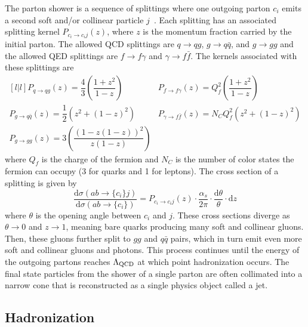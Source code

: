 The parton shower is a sequence of splittings where one outgoing parton $c_i$ emits a second soft and/or collinear particle $j$~\cite{Sjostrand2015}.
Each splitting has an associated splitting kernel $P_{c_i \rightarrow c_i j}(z)$, where $z$ is the momentum fraction carried by the initial parton.
The allowed QCD splittings are $q\rightarrow qg$, $g\rightarrow q \bar q$, and $g\rightarrow gg$ and the allowed QED splittings are $f\rightarrow f\gamma$ and $\gamma \rightarrow f \bar f$.
The kernels associated with these splittings are
\begin{equation}
  \begin{matrix}[l | l]
    P_{q\rightarrow qg}(z) = \dfrac{4}{3} \left( \dfrac{1+z^2}{1-z} \right)
    & P_{f \rightarrow f \gamma}(z) = Q_f^2 \left( \dfrac{1+z^2}{1-z} \right)
    \\ P_{g\rightarrow q \bar q}(z) = \dfrac{1}{2} \left( z^2 + (1-z)^2\right)
    & P_{\gamma \rightarrow f \bar f}(z) = N_C Q_f^2 \left( z^2 + (1-z)^2 \right) 
    \\ P_{g\rightarrow gg}(z) = 3 \left( \dfrac{(1-z(1-z))^2}{z(1-z)} \right)  & 
  \end{matrix}
\end{equation}
where $Q_f$ is the charge of the fermion and $N_C$ is the number of color states the fermion can occupy (3 for quarks and 1 for leptons).
The cross section of a splitting is given by
\begin{equation}
  \frac{\text{d}\sigma (ab\rightarrow \{c_i\}j)}{\text{d}\sigma (ab\rightarrow \{c_i\})}
  = P_{c_i\rightarrow c_i j}(z) \cdot \frac{\alpha_s}{2\pi} \cdot \frac{\text{d}\theta}{\theta} \cdot \text{d}z 
\end{equation}
where $\theta$ is the opening angle between $c_i$ and $j$.
These cross sections diverge as $\theta \rightarrow 0$ and $z \rightarrow 1$, meaning bare quarks producing many soft and collinear gluons.
Then, these gluons further split to $gg$ and $q\bar q$ pairs, which in turn emit even more soft and collinear gluons and photons.
This process continues until the energy of the outgoing partons reaches $\Lambda_{\text{QCD}}$ at which point hadronization occurs.
The final state particles from the shower of a single parton are often collimated into a narrow cone that is reconstructed as a single physics object called a jet.

\subsection{Hadronization}

